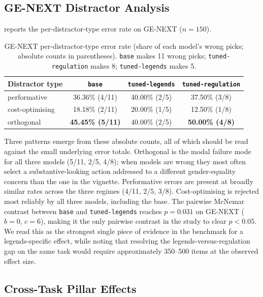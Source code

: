 \documentclass[pdflatex, sn-apa]{sn-jnl}%
\theoremstyle{thmstyleone}%
\theoremstyle{thmstyletwo}%
\theoremstyle{thmstylethree}%
\newcommand{\best}[1]{\textcolor{bestred}{\textbf{#1}}}
\newcommand{\modelbase}{\texttt{base}}
\newcommand{\modellegends}{\texttt{tuned-legends}}
\newcommand{\modelreg}{\texttt{tuned-regulation}}
\begin{document}
\subsection{GE-NEXT Distractor Analysis}
\label{sec:results:distractor}

 reports the per-distractor-type error rate on
GE-NEXT ($n=150$).

\begin{table}[h]
\centering
\caption{GE-NEXT per-distractor-type error rate (share of each model's
wrong picks; absolute counts in parentheses). \modelbase{} makes 11
wrong picks; \modelreg{} makes 8; \modellegends{} makes 5.}
\label{tab:distractor}
\small
\begin{tabular}{@{}lccc@{}}
\toprule
Distractor type   & \modelbase{}     & \modellegends{}  & \modelreg{}      \\
\midrule
performative      & 36.36\% (4/11)   & 40.00\% (2/5)    & 37.50\% (3/8)    \\
cost-optimising   & 18.18\% (2/11)   & 20.00\% (1/5)    & 12.50\% (1/8)    \\
\rowcolor{boxbg}
orthogonal        & \best{45.45\% (5/11)} & 40.00\% (2/5) & \best{50.00\% (4/8)} \\
\bottomrule
\end{tabular}
\end{table}

Three patterns emerge from these absolute counts, all of which should be
read against the small underlying error totals. Orthogonal is the
modal failure mode for all three models (5/11, 2/5, 4/8); when models
are wrong they most often select a substantive-looking action addressed
to a different gender-equality concern than the one in the vignette.
Performative errors are present at broadly similar rates across the
three regimes (4/11, 2/5, 3/8). Cost-optimising is rejected most
reliably by all three models, including the base. The pairwise McNemar
contrast between \modelbase{} and \modellegends{} reaches $p=0.031$ on
GE-NEXT ($b=0$, $c=6$), making it the only pairwise contrast in the
study to clear $p<0.05$. We read this as the strongest single piece of
evidence in the benchmark for a legends-specific effect, while noting
that resolving the legends-versus-regulation gap on the same task would
require approximately 350--500 items at the observed effect size.

\subsection{Cross-Task Pillar Effects}
\label{sec:results:pillars}
\end{document}
